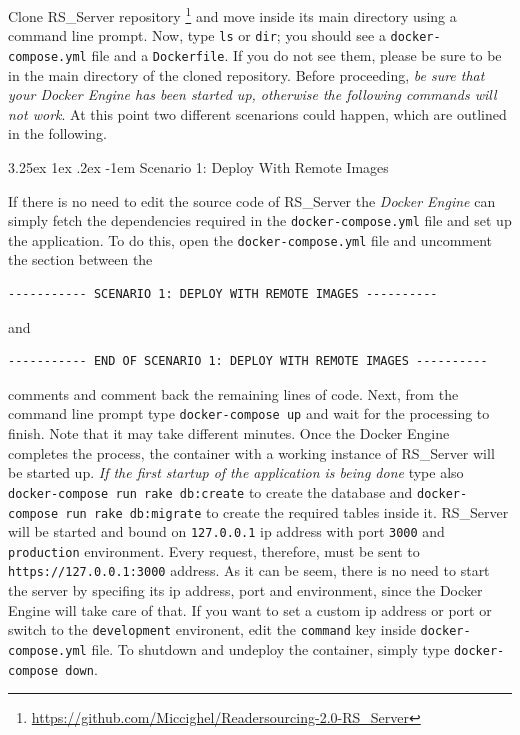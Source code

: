 \documentclass[a4paper, english]{article}
\makeatletter
\newcounter{subsubsubsection}[subsubsection]
\renewcommand\paragraph{\@startsection{paragraph}{5}{\z@}%
  {3.25ex \@plus1ex \@minus.2ex}%
  {-1em}%
  {\normalfont\normalsize\bfseries}}
\makeatother
\begin{document}

Clone  RS\_Server repository \footnote{\url{https://github.com/Miccighel/Readersourcing-2.0-RS_Server}} and move inside its main directory using a command line prompt. Now, type \verb|ls| or \verb|dir|; you should see a \verb|docker-compose.yml| file and a \verb|Dockerfile|. If you do not see them, please be sure to be in the main directory of the cloned repository. Before proceeding, \emph{be sure that your Docker Engine has been started up, otherwise the following commands will not work}. At this point two different scenarions could happen, which are outlined in the following. 

\paragraph{Scenario 1: Deploy With Remote Images}

If there is no need to edit the source code of RS\_Server the \emph{Docker Engine} can simply fetch the dependencies required in the \verb|docker-compose.yml| file and set up the application. To do this, open the \verb|docker-compose.yml| file and uncomment the section between the 
\begin{verbatim}
----------- SCENARIO 1: DEPLOY WITH REMOTE IMAGES ----------
\end{verbatim}
and 
\begin{verbatim}
----------- END OF SCENARIO 1: DEPLOY WITH REMOTE IMAGES ----------
\end{verbatim} 
comments and comment back the remaining lines of code. Next, from the command line prompt type \verb|docker-compose up| and wait for the processing to finish. Note that it may take different minutes. Once the Docker Engine completes the process, the container with a working instance of RS\_Server will be started up. \emph{If the first startup of the application is being done} type also \verb|docker-compose run rake db:create| to create the database and \verb|docker-compose run rake db:migrate| to create the required tables inside it. RS\_Server will be started and bound on \verb|127.0.0.1| ip address with port \verb|3000| and \verb|production| environment. Every request, therefore, must be sent to \verb|https://127.0.0.1:3000| address. As it can be seem, there is no need to start the server by specifing its ip address, port and environment, since the Docker Engine will take care of that. If you want to set a custom ip address or port or switch to the \verb|development| environent, edit the \verb|command| key inside \verb|docker-compose.yml| file. To shutdown and undeploy the container, simply type \verb|docker-compose down|.
\end{document}
